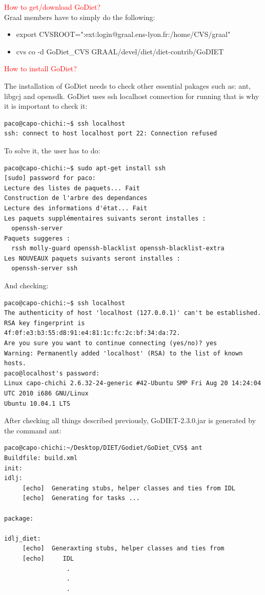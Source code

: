 \documentclass[12pt,a4paper]{book}
\begin{document}
\noindent \textcolor{red}{How to get/download GoDiet?} \\
\noindent Graal members have to simply do the following:
\begin{itemize}
\item export CVSROOT=":ext:login@graal.ens-lyon.fr:/home/CVS/graal"
\item cvs co -d GoDiet\_CVS GRAAL/devel/diet/diet-contrib/GoDIET\\
\end{itemize}

\noindent \textcolor{red}{How to install GoDiet?}

\noindent The installation of GoDiet needs to check other essential pakages such as: ant, libgcj and opensdk. GoDiet uses ssh localhost connection for running 
that is why it is important to check it:
\begin{verbatim}
paco@capo-chichi:~$ ssh localhost 
ssh: connect to host localhost port 22: Connection refused
\end{verbatim}

\noindent To solve it, the user has to do:
\begin{verbatim}
paco@capo-chichi:~$ sudo apt-get install ssh
[sudo] password for paco: 
Lecture des listes de paquets... Fait
Construction de l'arbre des dependances       
Lecture des informations d'état... Fait
Les paquets supplémentaires suivants seront installes : 
  openssh-server
Paquets suggeres :
  rssh molly-guard openssh-blacklist openssh-blacklist-extra
Les NOUVEAUX paquets suivants seront installes :
  openssh-server ssh
\end{verbatim}

\noindent And checking:
\begin{verbatim}
paco@capo-chichi:~$ ssh localhost
The authenticity of host 'localhost (127.0.0.1)' can't be established.
RSA key fingerprint is 4f:0f:e3:b3:55:d8:91:e4:81:1c:fc:2c:bf:34:da:72.
Are you sure you want to continue connecting (yes/no)? yes
Warning: Permanently added 'localhost' (RSA) to the list of known hosts.
paco@localhost's password: 
Linux capo-chichi 2.6.32-24-generic #42-Ubuntu SMP Fri Aug 20 14:24:04 UTC 2010 i686 GNU/Linux
Ubuntu 10.04.1 LTS
\end{verbatim}

\noindent After checking all things described previously, GoDIET-2.3.0.jar is generated by the command ant:

\begin{verbatim}
paco@capo-chichi:~/Desktop/DIET/Godiet/GoDiet_CVS$ ant 
Buildfile: build.xml
init:
idlj:
     [echo]  Generating stubs, helper classes and ties from IDL
     [echo]  Generating for tasks ...

package:

idlj_diet:
     [echo]  Generaxting stubs, helper classes and ties from
     [echo]     IDL
                 . 
                 . 
                 .
\end{verbatim}
\end{document}
